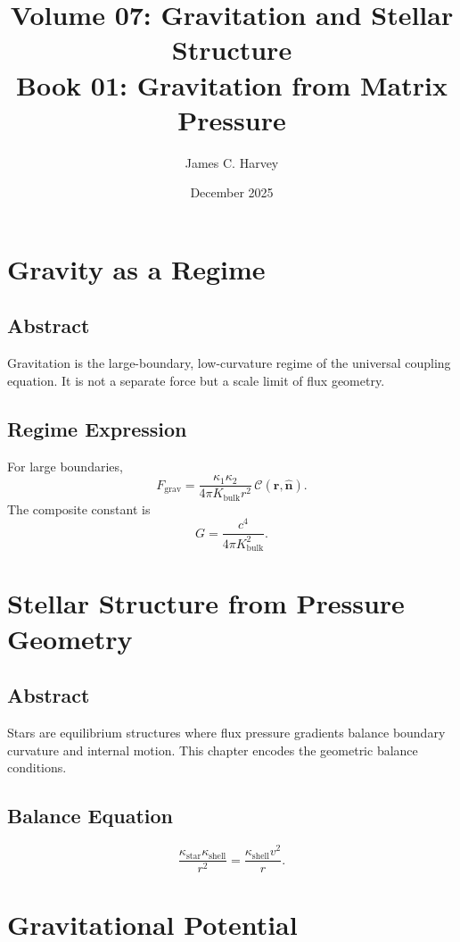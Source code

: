 \documentclass[12pt]{book}
\title{Volume 07: Gravitation and Stellar Structure \\ Book 01: Gravitation from Matrix Pressure}
\author{James C. Harvey}
\date{December 2025}
\begin{document}
\maketitle
\tableofcontents

\chapter{Gravity as a Regime}

\section*{Abstract}
Gravitation is the large-boundary, low-curvature regime of the universal coupling equation. It is not a
separate force but a scale limit of flux geometry.

\section{Regime Expression}
For large boundaries,
\begin{equation}
F_{\text{grav}} = \frac{\kappa_1 \kappa_2}{4\pi K_{\text{bulk}} r^2}\,\mathcal{C}(\mathbf{r},\hat{\mathbf{n}}).
\end{equation}
The composite constant is
\begin{equation}
G = \frac{c^4}{4\pi K_{\text{bulk}}^2}.
\end{equation}

\chapter{Stellar Structure from Pressure Geometry}

\section*{Abstract}
Stars are equilibrium structures where flux pressure gradients balance boundary curvature and internal
motion. This chapter encodes the geometric balance conditions.

\section{Balance Equation}
\begin{equation}
\frac{\kappa_{\text{star}} \kappa_{\text{shell}}}{r^2} = \frac{\kappa_{\text{shell}} v^2}{r}.
\end{equation}

\chapter{Gravitational Potential}
\end{document}
